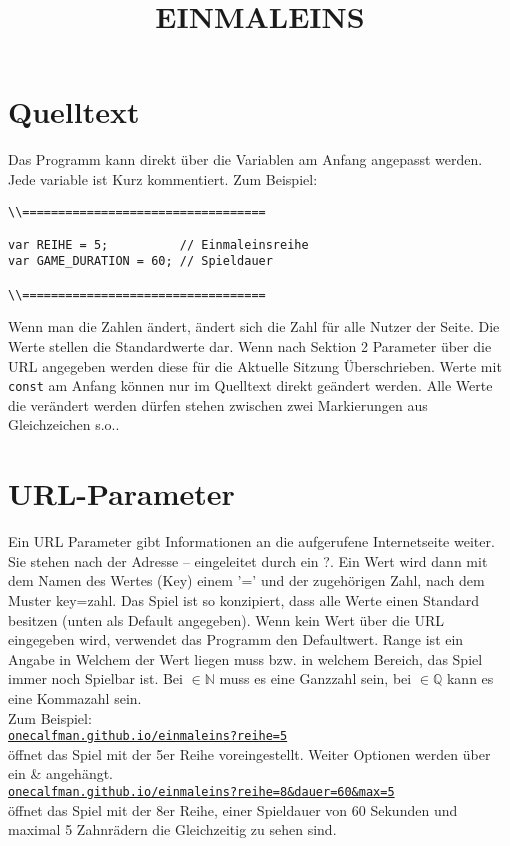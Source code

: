 \documentclass[]{article}
\title{EINMALEINS}
\begin{document}
\maketitle

\begin{multicols}{2}

\section{Quelltext}

Das Programm kann direkt über die Variablen am Anfang angepasst werden. Jede variable ist Kurz kommentiert.
Zum Beispiel:

\begin{verbatim}
\\==================================

var REIHE = 5;          // Einmaleinsreihe
var GAME_DURATION = 60; // Spieldauer

\\==================================
\end{verbatim}

	Wenn man die Zahlen ändert, ändert sich die Zahl für alle Nutzer der Seite. Die Werte stellen die Standardwerte dar. Wenn nach Sektion 2 Parameter über die URL angegeben werden diese für die Aktuelle Sitzung Überschrieben. Werte mit \texttt{const} am Anfang können nur im Quelltext direkt geändert werden. Alle Werte die verändert werden dürfen stehen zwischen zwei Markierungen aus Gleichzeichen s.o..

\section{URL-Parameter}

Ein URL Parameter gibt Informationen an die aufgerufene Internetseite weiter. Sie stehen nach der Adresse -- eingeleitet durch ein 
?. Ein Wert wird dann mit dem Namen des Wertes (Key) einem '=' und der zugehörigen Zahl, nach dem Muster key=zahl. Das Spiel ist so konzipiert, dass alle Werte einen Standard besitzen (unten als Default angegeben). Wenn kein Wert über die URL eingegeben wird, verwendet das Programm den Defaultwert. Range ist ein Angabe in Welchem der Wert liegen muss bzw. in welchem Bereich, das Spiel immer noch Spielbar ist. Bei $\in \mathbb{N} $ muss es eine Ganzzahl sein, bei $\in \mathbb{Q} $ kann es eine Kommazahl sein.\\
Zum Beispiel: \\
\texttt{\href{onecalfman.github.io/einmaleins?reihe=5}{onecalfman.github.io/einmaleins?reihe=5}} \\
öffnet das Spiel mit der 5er Reihe voreingestellt.
Weiter Optionen werden über ein \& angehängt. \\
\texttt{\href{onecalfman.github.io/einmaleins?reihe=8\&dauer=60\&max=5}{onecalfman.github.io/einmaleins?reihe=8\&dauer=60\&max=5}} \\
öffnet das Spiel mit der 8er Reihe, einer Spieldauer von 60 Sekunden und maximal 5 Zahnrädern die Gleichzeitig zu sehen sind.

\end{multicols}
\end{document}
